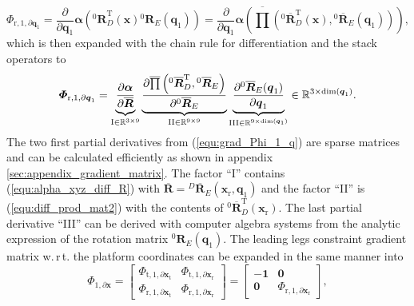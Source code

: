 \documentclass[robotics,article,submit,moreauthors,pdftex]{Definitions/mdpi}
\newcommand{\bm}[1]{\boldsymbol{#1}}
\newcommand{\rotmat}[2]{{{ }^{#1}\boldsymbol{R}}_{#2}}
\newcommand{\rotmato}[2]{{{ }^{#1}\boldsymbol{\overline{R}}}_{#2}}
\newcommand{\transp}[0]{{\mathrm{T}}}
\let\Phi\varPhi
\begin{document}
\begin{equation}
\bm{\Phi}_{\mathrm{r},1,\partial\bm{q}_1}
=
\frac{\partial}{\partial \bm{q}_1} \bm{\alpha}\left(\rotmat{0}{D}^\transp(\bm{x}) \rotmat{0}{E}(\bm{q}_1)\right)
=
\frac{\partial}{\partial \bm{q}_1} \bm{\alpha}\left(\overline{\prod}\left( \rotmato{0}{D}^\transp(\bm{x}), \rotmato{0}{E}(\bm{q}_1)\right)\right), \label{equ:grad_Phi_1_q_part1}
\end{equation}
%
which is then expanded with the chain rule for differentiation and the stack operators to
%
\begin{equation}
\bm{\Phi}_{\mathrm{r},1,\partial\bm{q}_1}
=
\underbrace{
	\vphantom{\frac{\partial \overline{\prod}\left(\rotmato{0}{D}^\transp, \rotmato{0}{E}\right)}{\partial \rotmato{0}{E}}}
	\frac{\partial \bm{\alpha}}{\partial \overline{\bm{R}}}
	}_{\mathrm{I} \in {\mathbb{R}}^{3 \times 9}}
\underbrace{
	\frac{\partial \overline{\prod}\left(\rotmato{0}{D}^\transp, \rotmato{0}{E}\right)}{\partial \rotmato{0}{E}}
	}_{\mathrm{II} \in {\mathbb{R}}^{9 \times 9}}
\underbrace{
	\vphantom{\frac{\partial \overline{\prod}\left(\rotmato{0}{D}^\transp, \rotmato{0}{E}\right)}{\partial \rotmato{0}{E}}}
	\frac{\partial \rotmato{0}{E}(\bm{q}_1)}{\partial \bm{q}_1}
	}_{\mathrm{III} \in {\mathbb{R}}^{9 \times \mathrm{dim}(\bm{q}_1)}}
\in {\mathbb{R}}^{3 \times \mathrm{dim}(\bm{q}_1)}.
\label{equ:grad_Phi_1_q}
\end{equation}
%
The two first partial derivatives from (\ref{equ:grad_Phi_1_q}) are sparse matrices and can be calculated efficiently as shown in appendix \ref{sec:appendix_gradient_matrix}.
The factor ``I'' contains (\ref{equ:alpha_xyz_diff_R}) with $\overline{\bm{R}}=\rotmato{D}{E}(\bm{x}_{\mathrm{r}},\bm{q}_1)$ and the factor ``II'' is (\ref{equ:diff_prod_mat2}) with the contents of $\rotmato{0}{D}^\transp(\bm{x}_{\mathrm{r}})$.
The last partial derivative ``III'' can be derived with computer algebra systems from the analytic expression of the rotation matrix $\rotmat{0}{E}(\bm{q}_1)$.
The leading legs constraint gradient matrix w.\,r\,t. the platform coordinates can be expanded in the same manner into
%
\begin{equation}
\bm{\Phi}_{1,\partial\bm{x}}
=
\begin{bmatrix}
\bm{\Phi}_{\mathrm{t},1,\partial\bm{x}_\mathrm{t}} & \bm{\Phi}_{\mathrm{t},1,\partial\bm{x}_\mathrm{r}} \\
\bm{\Phi}_{\mathrm{r},1,\partial\bm{x}_\mathrm{t}} &
\bm{\Phi}_{\mathrm{r},1,\partial\bm{x}_\mathrm{r}}
\end{bmatrix}
=
\begin{bmatrix}
-\bm{1} & \bm{0} \\
\bm{0} &
\bm{\Phi}_{\mathrm{r},1,\partial\bm{x}_\mathrm{r}}
\end{bmatrix},
\label{equ:Phi_1_grad_x}
\end{equation}
\end{document}
